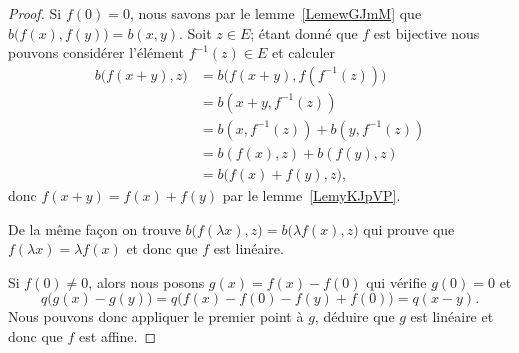 \begin{proof}
    Si \( f(0)=0\), nous savons par le lemme~\ref{LemewGJmM} que \( b\big( f(x),f(y) \big)=b(x,y)\). Soit \( z\in E\); étant donné que \( f\) est bijective nous pouvons considérer l'élément \( f^{-1}(z)\in E\) et calculer
    \begin{subequations}
        \begin{align}
            b\big( f(x+y),z \big)&=b\big( f(x+y),f(f^{-1}(z)) \big)\\
            &=b(x+y,f^{-1}(z))\\
            &=b(x,f^{-1}(z))+b(y,f^{-1}(z))\\
            &=b(f(x),z)+b(f(y),z)\\
            &=b\big( f(x)+f(y),z \big),
        \end{align}
    \end{subequations}
    donc \( f(x+y)=f(x)+f(y)\) par le lemme~\ref{LemyKJpVP}.

    De la même façon on trouve \( b\big( f(\lambda x),z \big)=b\big( \lambda f(x),z \big)\) qui prouve que \( f(\lambda x)=\lambda f(x)\) et donc que \( f\) est linéaire.

    Si \( f(0)\neq 0\), alors nous posons \( g(x)=f(x)-f(0)\) qui vérifie \( g(0)=0\) et
    \begin{equation}
        q\big( g(x)-g(y) \big)=q\big( f(x)-f(0)-f(y)+f(0) \big)=q(x-y).
    \end{equation}
    Nous pouvons donc appliquer le premier point à \( g\), déduire que \( g\) est linéaire et donc que \( f\) est affine.
\end{proof}

{}

